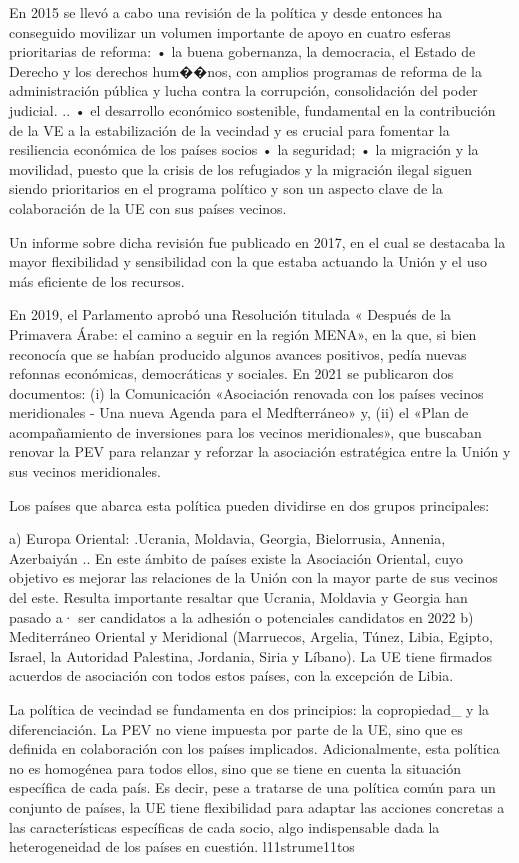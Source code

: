 \documentclass[10pt,a4paper]{article}
\begin{document}
En 2015 se llevó a cabo una revisión de la política y desde entonces ha conseguido movilizar un volumen importante de apoyo en cuatro esferas prioritarias de reforma:
• la buena gobernanza, la democracia, el Estado de Derecho y los derechos hum��nos, con amplios programas de reforma de la administración pública y lucha contra la corrupción, consolidación del poder judicial. ..
• el desarrollo económico sostenible, fundamental en la contribución de la VE a la estabilización de la vecindad y es crucial para fomentar la resiliencia económica de los países socios
• la seguridad;
• la migración y la movilidad, puesto que la crisis de los refugiados y la migración ilegal siguen siendo prioritarios en el programa político y son un aspecto clave de la colaboración de la UE con sus países vecinos.

Un informe sobre dicha revisión fue publicado en 2017, en el cual se destacaba la mayor flexibilidad y sensibilidad con la que estaba actuando la Unión y el uso más eficiente de los recursos.

En 2019, el Parlamento aprobó una Resolución titulada « Después de la Primavera Árabe: el camino a seguir en la región MENA», en la que, si bien reconocía que se habían producido algunos avances positivos, pedía nuevas refonnas económicas, democráticas y sociales. En 2021 se publicaron dos documentos: (i) la Comunicación «Asociación renovada con los países vecinos meridionales - Una nueva Agenda para el Medfterráneo» y, (ii) el «Plan de acompañamiento de inversiones para los vecinos meridionales», que buscaban renovar la PEV para relanzar y reforzar la asociación estratégica entre la Unión y sus vecinos meridionales.

Los países que abarca esta política pueden dividirse en dos grupos principales:

a) Europa Oriental: .Ucrania, Moldavia, Georgia, Bielorrusia, Annenia, Azerbaiyán .. En este ámbito de países existe la Asociación Oriental, cuyo objetivo es mejorar las relaciones de la Unión con la mayor parte de sus vecinos del este. Resulta importante resaltar que Ucrania, Moldavia y Georgia han pasado a· ser candidatos a la adhesión o potenciales candidatos en 2022
b) Mediterráneo Oriental y Meridional (Marruecos, Argelia, Túnez, Libia, Egipto, Israel, la Autoridad Palestina, Jordania, Siria y Líbano). La UE tiene firmados acuerdos de asociación con todos estos países, con la excepción de Libia. 

La política de vecindad se fundamenta en dos principios: la copropiedad_ y la diferenciación. La PEV no viene impuesta por parte de la UE, sino que es definida en colaboración con los países implicados. Adicionalmente, esta política no es homogénea para todos ellos, sino que se tiene en cuenta la situación específica de cada país. Es decir, pese a tratarse de una política común para un conjunto de países, la UE tiene flexibilidad para adaptar las acciones concretas a las características específicas de cada socio, algo indispensable dada la heterogeneidad de los países en cuestión. l11strume11tos
\end{document}
